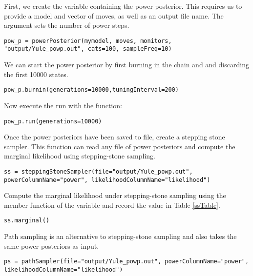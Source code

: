 First, we create the variable containing the power posterior. 
This requires us to provide a model and vector of moves, as well as an output file name. 
The  argument sets the number of power steps.
{\tt \begin{snugshade*}
\begin{lstlisting}
pow_p = powerPosterior(mymodel, moves, monitors, "output/Yule_powp.out", cats=100, sampleFreq=10) 
\end{lstlisting}
\end{snugshade*}}

We can start the power posterior by first burning in the chain and and discarding the first 10000 states.  
{\tt \begin{snugshade*}
\begin{lstlisting}
pow_p.burnin(generations=10000,tuningInterval=200)
\end{lstlisting}
\end{snugshade*}}

Now execute the run with the  function:
{\tt \begin{snugshade*}
\begin{lstlisting}
pow_p.run(generations=10000)  
\end{lstlisting}
\end{snugshade*}}

Once the power posteriors have been saved to file, create a stepping stone sampler. 
This function can read any file of power posteriors and compute the marginal likelihood using stepping-stone sampling. 
{\tt \small \begin{snugshade*}
\begin{lstlisting}
ss = steppingStoneSampler(file="output/Yule_powp.out", powerColumnName="power", likelihoodColumnName="likelihood")
\end{lstlisting}
\end{snugshade*}}

Compute the marginal likelihood under stepping-stone sampling using the member function  of the  variable and record the value in Table \ref{ssTable}.
{\tt \begin{snugshade*}
\begin{lstlisting}
ss.marginal() 
\end{lstlisting}
\end{snugshade*}}

Path sampling is an alternative to stepping-stone sampling and also takes the same power posteriors as input. 
{\tt \small \begin{snugshade*}
\begin{lstlisting}
ps = pathSampler(file="output/Yule_powp.out", powerColumnName="power", likelihoodColumnName="likelihood")
\end{lstlisting}
\end{snugshade*}}

